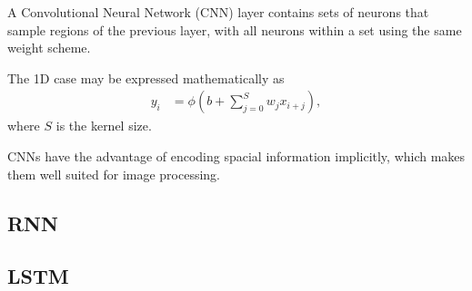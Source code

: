A Convolutional Neural Network (CNN) layer contains sets of neurons that sample
regions of the previous layer, with all neurons within a set using the same
weight scheme.

The 1D case may be expressed mathematically as
\begin{align*}
    y_i &= \phi\left(b + \sum_{j=0}^{S} w_j x_{i+j}\right),
\end{align*}
where $S$ is the kernel size.
\begin{center}
    
\end{center}
CNNs have the advantage of encoding spacial information implicitly, which makes
them well suited for image processing.

\subsection{RNN}
\subsection{LSTM}
